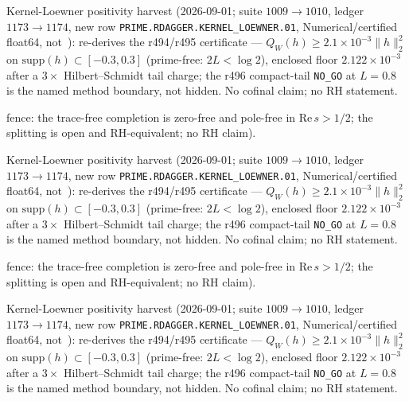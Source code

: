 
Kernel-Loewner positivity harvest (2026-09-01; suite $1009\to1010$, ledger $1173\to1174$,
new row \texttt{PRIME.RDAGGER.KERNEL\_LOEWNER.01}, Numerical/certified float64, not~\mE):
re-derives the r494/r495 certificate --- $Q_W(h)\ge 2.1{\times}10^{-3}\|h\|_2^2$ on
$\mathrm{supp}(h)\subset[-0.3,0.3]$ (prime-free: $2L<\log 2$), enclosed floor
$2.122{\times}10^{-3}$ after a $3\times$ Hilbert--Schmidt tail charge; the r496
compact-tail \texttt{NO\_GO} at $L=0.8$ is the named method boundary, not hidden.
No cofinal claim; no RH statement.


fence: the trace-free completion is zero-free and pole-free in $\mathrm{Re}\,s>1/2$; the splitting is open and RH-equivalent; no RH claim).

Kernel-Loewner positivity harvest (2026-09-01; suite $1009\to1010$, ledger $1173\to1174$,
new row \texttt{PRIME.RDAGGER.KERNEL\_LOEWNER.01}, Numerical/certified float64, not~\mE):
re-derives the r494/r495 certificate --- $Q_W(h)\ge 2.1{\times}10^{-3}\|h\|_2^2$ on
$\mathrm{supp}(h)\subset[-0.3,0.3]$ (prime-free: $2L<\log 2$), enclosed floor
$2.122{\times}10^{-3}$ after a $3\times$ Hilbert--Schmidt tail charge; the r496
compact-tail \texttt{NO\_GO} at $L=0.8$ is the named method boundary, not hidden.
No cofinal claim; no RH statement.


fence: the trace-free completion is zero-free and pole-free in $\mathrm{Re}\,s>1/2$; the splitting is open and RH-equivalent; no RH claim).

Kernel-Loewner positivity harvest (2026-09-01; suite $1009\to1010$, ledger $1173\to1174$,
new row \texttt{PRIME.RDAGGER.KERNEL\_LOEWNER.01}, Numerical/certified float64, not~\mE):
re-derives the r494/r495 certificate --- $Q_W(h)\ge 2.1{\times}10^{-3}\|h\|_2^2$ on
$\mathrm{supp}(h)\subset[-0.3,0.3]$ (prime-free: $2L<\log 2$), enclosed floor
$2.122{\times}10^{-3}$ after a $3\times$ Hilbert--Schmidt tail charge; the r496
compact-tail \texttt{NO\_GO} at $L=0.8$ is the named method boundary, not hidden.
No cofinal claim; no RH statement.


